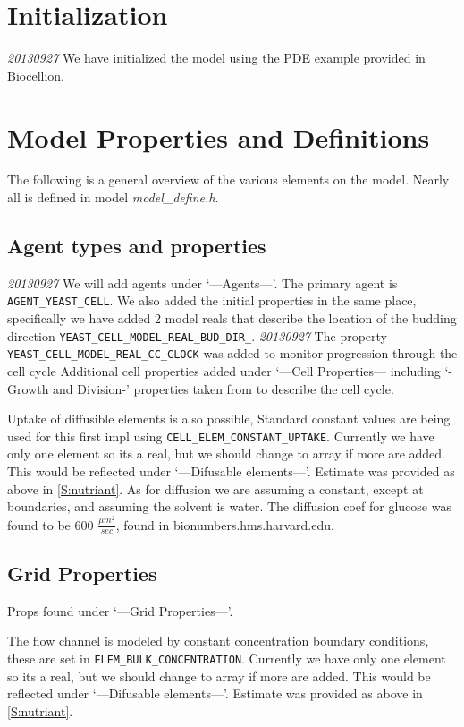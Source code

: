 \documentclass{article}
\begin{document}
\section{Initialization}
\emph{20130927} We have initialized the model using the PDE example provided in Biocellion.

\section{Model Properties and Definitions}
The following is a general overview of the various elements on the model.
Nearly all is defined in model \textit{model\_define.h}.

\subsection{Agent types and properties}
\emph{20130927} We will add agents under `---Agents---'.
The primary agent is \texttt{AGENT\_YEAST\_CELL}.
We also added the initial properties in the same place,
specifically we have added 2 model reals that describe the 
location of the budding direction \texttt{YEAST\_CELL\_MODEL\_REAL\_BUD\_DIR\_}.
\emph{20130927} The property \texttt{YEAST\_CELL\_MODEL\_REAL\_CC\_CLOCK}
was added to monitor progression through the cell cycle \cite{Charvin2009}
Additional cell properties added under `---Cell Properties--- including 
`-Growth and Division-' properties taken from \cite{Charvin2009} to describe the cell cycle.

Uptake of diffusible elements is also possible,
Standard constant values are being used for this first impl using \texttt{CELL\_ELEM\_CONSTANT\_UPTAKE}.
Currently we have only one element so its a real, 
but we should change to array if more are added.
This would be reflected under `---Difusable elements---'.
Estimate was provided as above in \ref{S:nutriant}.
As for diffusion we are assuming a constant, except at boundaries,
and assuming the solvent is water.
The diffusion coef for glucose was found to be 600 $\frac{\mu m^2}{sec}$,
found in bionumbers.hms.harvard.edu.



\subsection{Grid Properties} 
Props found under `---Grid Properties---'.

The flow channel is modeled by constant concentration boundary conditions, 
these are set in \texttt{ELEM\_BULK\_CONCENTRATION}.
Currently we have only one element so its a real, 
but we should change to array if more are added.
This would be reflected under `---Difusable elements---'.
Estimate was provided as above in \ref{S:nutriant}. 
\end{document}
